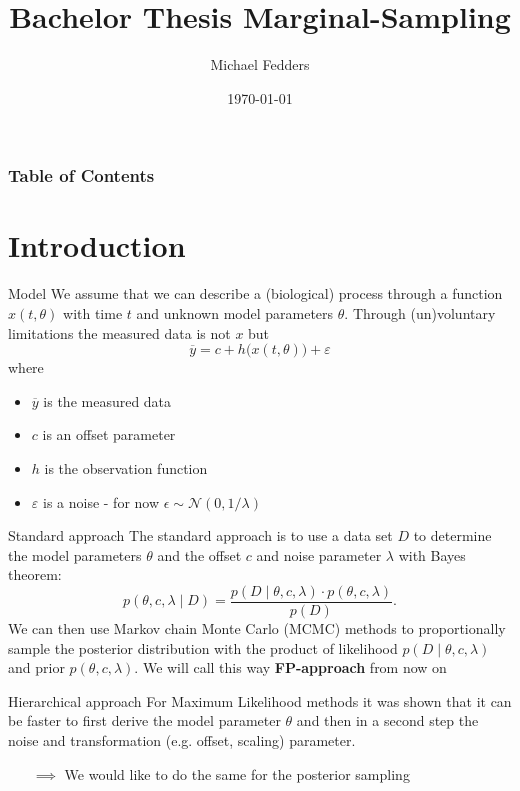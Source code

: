 \documentclass{beamer}
\title{Bachelor Thesis Marginal-Sampling}
\date{\today}
\author{Michael Fedders}
\begin{document}
	\maketitle
  	\begin{frame}[plain]
		\frametitle{Table of Contents}
		\tableofcontents
	\end{frame}
	
\section{Introduction}
	
	\begin{frame}{Model}
		We assume that we can describe a (biological) process through a function
		$x(t, \theta)$ with time $t$ and unknown model parameters $\theta$.
		Through (un)voluntary limitations the measured data is not $x$ but
		\[
			\overline{y} = c + h\bigl(x(t,\theta)\bigr) + \varepsilon
  		\]
		where
  		\begin{itemize}
  		\item $\overline{y}$ is the measured data
  		\item $c$ is an offset parameter
  		\item $h$ is the observation function
  		\item $\varepsilon$ is a noise - for now $\epsilon \sim \mathcal{N}(0, 
  		1/\lambda)$
  		\end{itemize}
	\end{frame}
	
	\begin{frame}{Standard approach}
		The standard approach is to use a data set $D$ to determine the model 
		parameters $\theta$ and the offset $c$ and noise parameter $\lambda$ with 			Bayes theorem:
		\[
			p(\theta,c,\lambda \mid D) = \frac{p(D \mid \theta,c,\lambda) \cdot
			p(\theta, c, \lambda)}{p(D)}.
		\]
		We can then use Markov chain Monte Carlo (MCMC) methods to proportionally 
		sample the posterior distribution with the product of likelihood 
		$p(D \mid \theta, c, \lambda)$ and prior $p(\theta, c, \lambda)$. We will 
		call this way \textbf{FP-approach} from now on
	\end{frame}
	
	\begin{frame}{Hierarchical approach}
		For Maximum Likelihood methods it was shown that it can be faster to first 
		derive the model parameter $\theta$ and then in a second step the noise
		and transformation (e.g. offset, scaling) parameter.
		\begin{itemize}
			\item[$\implies$] We would like to do the same for the posterior
			sampling
		\end{itemize}
	\end{frame}
	
\end{document}
